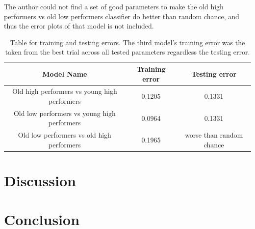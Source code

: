 \documentclass[a4paper,11pt,oneside]{article}
\begin{document}
The author could not find a set of good parameters to make the old high performers vs old low performers classifier do better than random chance, and thus the error plots of that model is not included. 


\begin{table}[h!]
	\centering
	\begin{tabular}{||c c c||} 
	\hline
	Model Name & Training error & Testing error \\ [0.5ex] 
	\hline\hline
	Old high performers vs young high performers & 0.1205 & 0.1331 \\ 
	\hline
	Old low performers vs young high performers & 0.0964 & 0.1331 \\ 
	\hline
	Old low performers vs old high performers & 0.1965 & worse than random chance \\ [1ex] 
	\hline
\end{tabular}
\caption{Table for training and testing errors. The third model's training error was the taken from the best trial across all tested parameters regardless the testing error.}
\end{table}



\section{Discussion}


\section{Conclusion}

\clearpage
\newpage



\end{document}

